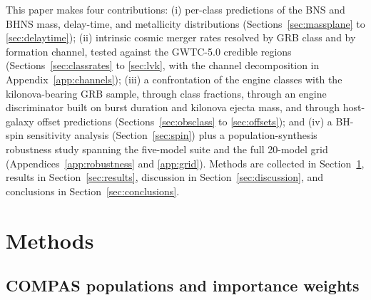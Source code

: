 \documentclass[twocolumn,amsmath]{aastex702}
\begin{document}
This paper makes four contributions: (i) per-class predictions of the BNS and
BHNS mass, delay-time, and metallicity distributions
(Sections~\ref{sec:massplane} to \ref{sec:delaytime}); (ii) intrinsic cosmic
merger rates resolved by GRB class and by \citet{broekgaarden2021} formation
channel, tested against the GWTC-5.0 credible regions
(Sections~\ref{sec:classrates} to \ref{sec:lvk}, with the channel
decomposition in Appendix~\ref{app:channels}); (iii) a confrontation of the
engine classes with the \citet{rastinejad2024} kilonova-bearing GRB sample,
through class fractions, through an engine discriminator built on burst
duration and kilonova ejecta mass, and through host-galaxy offset predictions
(Sections~\ref{sec:obsclass} to \ref{sec:offsets}); and (iv) a BH-spin
sensitivity analysis (Section~\ref{sec:spin}) plus a population-synthesis
robustness study spanning the five-model suite and the full 20-model
\citet{broekgaarden2021} grid (Appendices~\ref{app:robustness} and
\ref{app:grid}). Methods are collected in Section~\ref{sec:methods}, results
in Section~\ref{sec:results}, discussion in Section~\ref{sec:discussion}, and
conclusions in Section~\ref{sec:conclusions}.

\section{Methods} \label{sec:methods}

\subsection{COMPAS populations and importance weights} \label{sec:populations}
\end{document}
